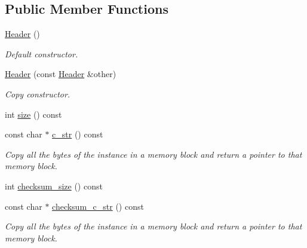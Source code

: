 \subsection*{Public Member Functions}
\begin{DoxyCompactItemize}
\item 
\hyperlink{structip_1_1Header_ae6fa99f56e2358a3a9c2ce58cc49e6b9}{Header} ()
\begin{DoxyCompactList}\small\item\em Default constructor. \end{DoxyCompactList}\item 
\hyperlink{structip_1_1Header_a5e6285562e806c49a9c2f015e7400460}{Header} (const \hyperlink{structip_1_1Header}{Header} \&other)
\begin{DoxyCompactList}\small\item\em Copy constructor. \end{DoxyCompactList}\item 
int \hyperlink{structip_1_1Header_ae426f14cf9842f7392c853463cf396da}{size} () const 
\item 
const char $\ast$ \hyperlink{structip_1_1Header_aedc814b0cc79df651dc869d721f32b83}{c\+\_\+str} () const 
\begin{DoxyCompactList}\small\item\em Copy all the bytes of the instance in a memory block and return a pointer to that memory block. \end{DoxyCompactList}\item 
int \hyperlink{structip_1_1Header_ae9467c8f725af565e43fb9210ad9a943}{checksum\+\_\+size} () const 
\item 
const char $\ast$ \hyperlink{structip_1_1Header_a32100da1e12b3a6a8aca71d665c7a2e9}{checksum\+\_\+c\+\_\+str} () const 
\begin{DoxyCompactList}\small\item\em Copy all the bytes of the instance in a memory block and return a pointer to that memory block. \end{DoxyCompactList}\end{DoxyCompactItemize}
